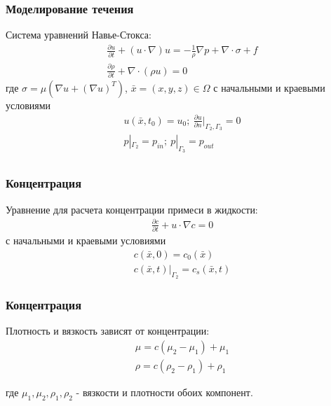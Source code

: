 \documentclass[14pt]{beamer}
\begin{document}
\begin{frame}
\frametitle{Моделирование течения}
Система уравнений Навье-Стокса:
\begin{gather}
    \label{eq:motion}
    \frac{\partial u}{\partial t} + (u \cdot \nabla) u = - \frac{1}{\rho} \nabla p + \nabla \cdot \sigma + f\\
    \label{eq:continuity}
    \frac{\partial \rho}{\partial t} + \nabla \cdot (\rho u) = 0 
\end{gather}
где $\sigma = \mu (\nabla u + (\nabla u)^{T})$, $\bar{x} = (x, y, z) \in \Omega$ с начальными и краевыми условиями
\begin{gather*}
    u(\bar{x}, t_0) = u_0;\ \frac{\partial u}{\partial n}|_{\Gamma_2, \Gamma_3} = 0\\
    p|_{\Gamma_2} = p_{in};\ p|_{\Gamma_3} = p_{out} \\
\end{gather*}

\end{frame}

\begin{frame}
\frametitle{Концентрация}
Уравнение для расчета концентрации примеси в жидкости:
\begin{gather}
    \label{eq:concentration}
    \frac{\partial c}{\partial t} + u \cdot \nabla c = 0
\end{gather}
с начальными и краевыми условиями
\begin{gather*}
    c(\bar{x}, 0) = c_0(\bar{x})\\
    c(\bar{x}, t)|_{\Gamma_2} = c_s(\bar{x}, t)
\end{gather*}

\end{frame}

\begin{frame}
\frametitle{Концентрация}
Плотность и вязкость зависят от концентрации:
\begin{gather}
    \label{eq:concentration_viscosity}
    \mu = c (\mu_2 - \mu_1) + \mu_1\\
    \label{eq:concentration_density}
    \rho = c (\rho_2 - \rho_1) + \rho_1
\end{gather}

где $\mu_1, \mu_2, \rho_1, \rho_2$ - вязкости и плотности обоих компонент.
\end{frame}
\end{document}
